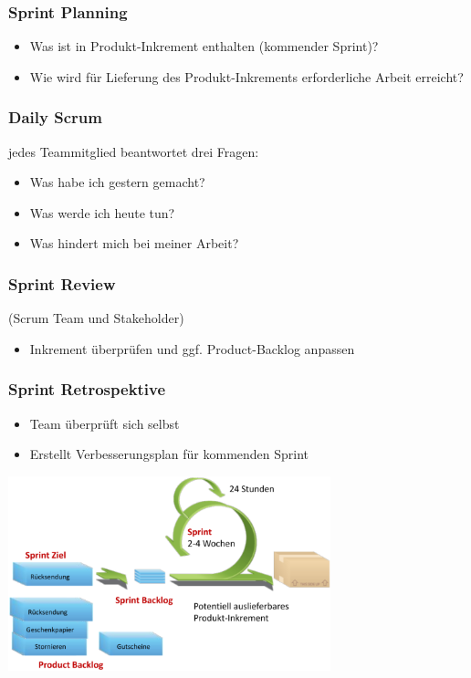 \documentclass[11pt, a4paper]{article}
\begin{document}
\subsubsection*{Sprint Planning}

\begin{itemize}
    \item Was ist in Produkt-Inkrement enthalten (kommender Sprint)?
    \item Wie wird für Lieferung des Produkt-Inkrements erforderliche Arbeit erreicht?
\end{itemize}

\subsubsection*{Daily Scrum}

jedes Teammitglied beantwortet drei Fragen:

\begin{itemize}
    \item Was habe ich gestern gemacht?
    \item Was werde ich heute tun?
    \item Was hindert mich bei meiner Arbeit?
\end{itemize}

\subsubsection*{Sprint Review}

(Scrum Team und Stakeholder)

\begin{itemize}
    \item Inkrement überprüfen und ggf. Product-Backlog anpassen
\end{itemize}

\subsubsection*{Sprint Retrospektive}

\begin{itemize}
    \item Team überprüft sich selbst
    \item Erstellt Verbesserungsplan für kommenden Sprint
\end{itemize}


\vspace*{2em}

\centering \includegraphics[width=0.7\textwidth]{Scrum-01.png} 

\raggedright
\end{document}
